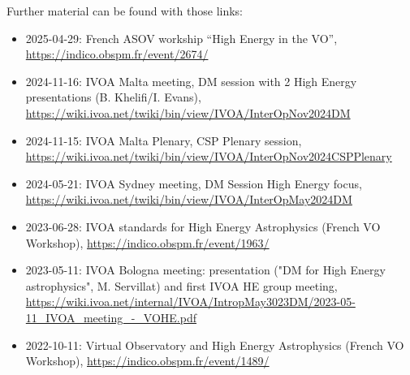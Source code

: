 \documentclass[11pt,a4paper]{ivoa}
\begin{document}
Further material can be found with those links:
\begin{itemize}
    \item 2025-04-29: French ASOV workship ``High Energy in the VO'', \url{https://indico.obspm.fr/event/2674/}
    \item 2024-11-16: IVOA Malta meeting, DM session with 2 High Energy presentations (B. Khelifi/I. Evans), \url{https://wiki.ivoa.net/twiki/bin/view/IVOA/InterOpNov2024DM}
    \item 2024-11-15: IVOA Malta Plenary, CSP Plenary session, \url{https://wiki.ivoa.net/twiki/bin/view/IVOA/InterOpNov2024CSPPlenary}
    \item 2024-05-21: IVOA Sydney meeting, DM Session High Energy focus, \url{https://wiki.ivoa.net/twiki/bin/view/IVOA/InterOpMay2024DM}
    \item 2023-06-28: IVOA standards for High Energy Astrophysics (French VO Workshop), \url{https://indico.obspm.fr/event/1963/}
    \item 2023-05-11: IVOA Bologna meeting: presentation ("DM for High Energy astrophysics", M. Servillat) and first IVOA HE group meeting, \url{https://wiki.ivoa.net/internal/IVOA/IntropMay3023DM/2023-05-11_IVOA_meeting_-_VOHE.pdf}
    \item 2022-10-11: Virtual Observatory and High Energy Astrophysics (French VO Workshop), \url{https://indico.obspm.fr/event/1489/}
\end{itemize}

\end{document}
